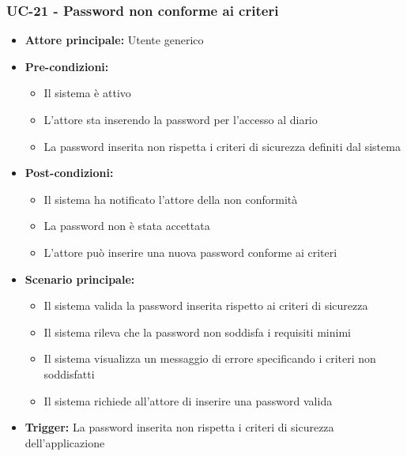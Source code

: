 \documentclass[a4paper,12pt]{article}
\begin{document}
\subsubsection{UC-21 - Password non conforme ai criteri} \label{subsec:UC-21}
\begin{itemize}
    \item \textbf{Attore principale:} Utente generico
    \item \textbf{Pre-condizioni:}
    \begin{itemize}
        \item Il sistema è attivo
        \item L'attore sta inserendo la password per l'accesso al diario
        \item La password inserita non rispetta i criteri di sicurezza definiti dal sistema
    \end{itemize}
    \item \textbf{Post-condizioni:} 
    \begin{itemize}
        \item Il sistema ha notificato l'attore della non conformità
        \item La password non è stata accettata
        \item L'attore può inserire una nuova password conforme ai criteri
    \end{itemize}
    \item \textbf{Scenario principale:} 
    \begin{itemize}
        \item Il sistema valida la password inserita rispetto ai criteri di sicurezza
        \item Il sistema rileva che la password non soddisfa i requisiti minimi
        \item Il sistema visualizza un messaggio di errore specificando i criteri non soddisfatti
        \item Il sistema richiede all'attore di inserire una password valida
    \end{itemize}
    \item \textbf{Trigger:} La password inserita non rispetta i criteri di sicurezza dell'applicazione
\end{itemize}
\end{document}
